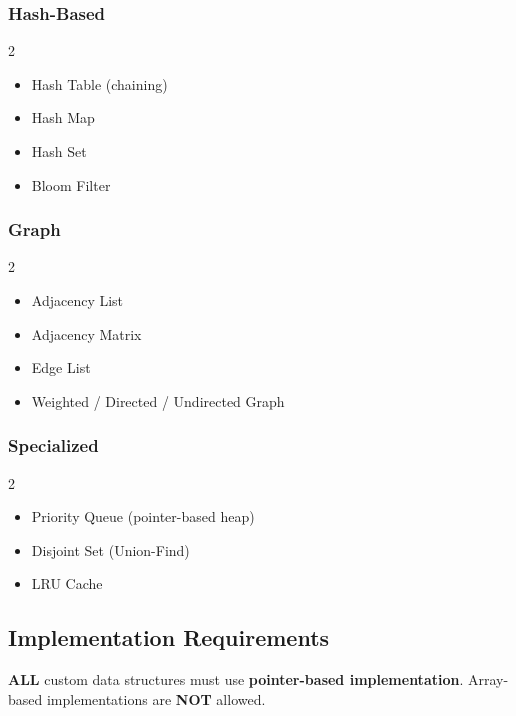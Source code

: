 \subsubsection{Hash-Based}

\begin{multicols}{2}
\begin{itemize}
  \item Hash Table (chaining)
  \item Hash Map
  \item Hash Set
  \item Bloom Filter
\end{itemize}
\end{multicols}

\subsubsection{Graph}

\begin{multicols}{2}
\begin{itemize}
  \item Adjacency List
  \item Adjacency Matrix
  \item Edge List
  \item Weighted / Directed / Undirected Graph
\end{itemize}
\end{multicols}

\subsubsection{Specialized}

\begin{multicols}{2}
\begin{itemize}
  \item Priority Queue (pointer-based heap)
  \item Disjoint Set (Union-Find)
  \item LRU Cache
\end{itemize}
\end{multicols}

\subsection{Implementation Requirements}

\begin{constraintbox}
\textbf{ALL} custom data structures must use \textbf{pointer-based implementation}. Array-based implementations are \textbf{NOT} allowed.
\end{constraintbox}

